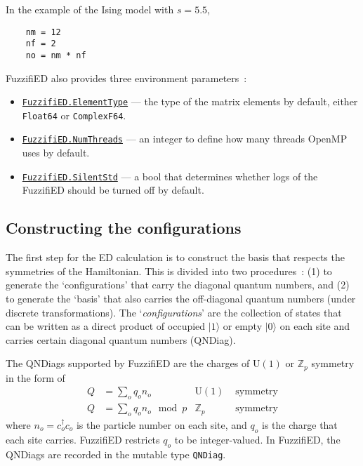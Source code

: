 \documentclass{timesjhep}
\begin{document}
In the example of the Ising model with $s=5.5$,
\begin{lstlisting}
    nm = 12
    nf = 2
    no = nm * nf
\end{lstlisting}

FuzzifiED also provides three environment parameters~:
\begin{itemize}
    \item \href{https://docs.fuzzified.world/core/\#FuzzifiED.ElementType}{\lstinline|FuzzifiED.ElementType|} --- the type of the matrix elements by default, either \lstinline|Float64| or \lstinline|ComplexF64|.
    \item \href{https://docs.fuzzified.world/core/\#FuzzifiED.NumThreads}{\lstinline|FuzzifiED.NumThreads|} --- an integer to define how many threads OpenMP uses by default.
    \item \href{https://docs.fuzzified.world/core/\#FuzzifiED.SilentStd}{\lstinline|FuzzifiED.SilentStd|} --- a bool that determines whether logs of the FuzzifiED should be turned off by default. 
\end{itemize}

\subsection{Constructing the configurations}
\label{sec:ed_confs}

The first step for the ED calculation is to construct the basis that respects the symmetries of the Hamiltonian. This is divided into two procedures~: (1) to generate the `configurations' that carry the diagonal quantum numbers, and (2) to generate the `basis' that also carries the off-diagonal quantum numbers (under discrete transformations). The `\emph{configurations}' are the collection of states that can be written as a direct product of occupied $|1\rangle$ or empty $|0\rangle$ on each site and carries certain diagonal quantum numbers (QNDiag). 

The QNDiags supported by FuzzifiED are the charges of $\mathrm{U}(1)$ or $\mathbb{Z}_p$ symmetry in the form of 
\begin{align}
    Q&=\sum_oq_on_o&\mathrm{U}(1)&\textrm{ symmetry}\nonumber\\
    Q&=\sum_oq_on_o\mod p&\mathbb{Z}_p&\textrm{ symmetry}
\end{align}
where $n_o=c^\dagger_oc_o$ is the particle number on each site, and $q_o$ is the charge that each site carries. FuzzifiED restricts $q_o$ to be integer-valued. In FuzzifiED, the QNDiags are recorded in the mutable type \lstinline|QNDiag|.
\end{document}
